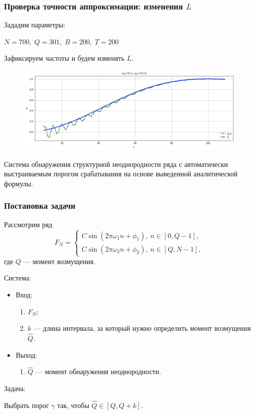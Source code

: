 \documentclass[11pt]{beamer}
\begin{document}
	\begin{frame}
		\frametitle{Проверка точности аппроксимации: изменения $ L $}
		Зададим параметры:
		
		$ N = 700,\; Q = 301,\; B = 200,\; T = 200 $
		
		Зафиксируем частоты и будем изменять $ L $.
		
		\begin{figure}[b]
			\centering
			\includegraphics[width=\linewidth]{imgs/dynamics_L}
		\end{figure}
		
	\end{frame}
	
	\begin{frame}
		\centering
		Система обнаружения структурной неоднородности ряда с автоматически выстраиваемым порогом срабатывания на основе выведенной аналитической формулы.
	\end{frame}
	
	\begin{frame}
		\frametitle{Постановка задачи}
		Рассмотрим ряд 
		\begin{equation*} 
			F_N = 
			\begin{cases} 
				C\sin(2\pi\omega_1 n + \phi_1),\ n \in [0, Q-1], \\ 
				C\sin(2\pi\omega_2 n + \phi_2),\ n \in [Q, N-1], 
			\end{cases} 
		\end{equation*}
		где $ Q $ --- момент возмущения. 
		
		
		Система: 
		
		\begin{itemize}
			\item Вход:
			\begin{enumerate}
				\item $ F_N $;
				\item $ k $ --- длина интервала, за который нужно определить момент возмущения $ \hat{Q} $.
			\end{enumerate}
			\item Выход:
			\begin{enumerate}
				\item $ \hat{Q} $ --- момент обнаружения неоднородности.
			\end{enumerate}
		\end{itemize}
		Задача:
		
		Выбрать порог $ \gamma $ так, чтобы $ \hat{Q} \in [Q, Q+k] $.
	\end{frame}
	
\end{document}
